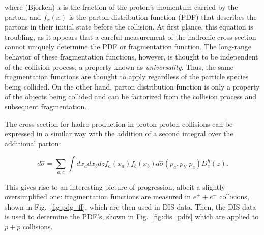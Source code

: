   where (Bjorken) \textit{x} is the fraction of the proton’s momentum carried by the parton, and $f_x(x)$ is the parton distribution function (PDF) that describes the partons in their initial state before the collision. At first glance, this equation is troubling, as it appears that a careful measurement of the hadronic cross section cannot uniquely determine the PDF or fragmentation function. The long-range behavior of these fragmentation functions, however, is thought to be independent of the collision process, a property known as \textit{universality}. Thus, the same fragmentation functions are thought to apply regardless of the particle species being collided. On the other hand, parton distribution function is only a property of the objects being collided and can be factorized from the collision process and subsequent fragmentation. 
 
  The cross section for hadro-production in proton-proton collisions can be expressed in a similar way with the addition of a second integral over the additional parton:

  \begin{equation}
    d\hat{\sigma}= \sum_{a,c} \int dx_a dx_b dz f_a(x_a) f_b(x_b) d\hat{\sigma}(p_a,p_b,p_c) D_c^h(z).
    \label{p+p_sidis}
  \end{equation}

  This gives rise to an interesting picture of progression, albeit a slightly oversimplified one: fragmentation functions are measured in $e^+ + e^-$ collisions, shown in Fig.~\ref{fig:pdg_ff}, which are then used in DIS data. Then, the DIS data is used to determine the PDF's, shown in Fig.~\ref{fig:dis_pdfs} which are applied to $p+p$ collisions.

